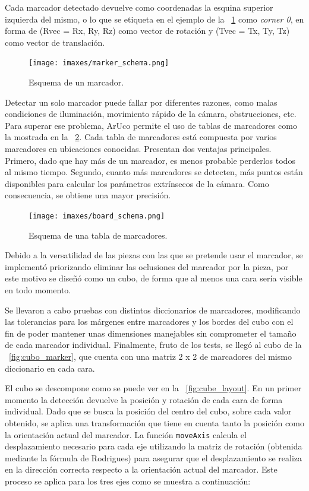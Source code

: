 Cada marcador detectado devuelve como coordenadas la esquina superior izquierda del mismo, o lo que se etiqueta en el ejemplo de la \figurename~\ref{fig:marker_schema} como \emph{corner 0}, en forma de (Rvec = {Rx, Ry, Rz}) como vector de rotación y (Tvec = {Tx, Ty, Tz}) como vector de translación.

\begin{figure}
  \centering
  \texttt{[image: imaxes/marker\_schema.png]}
  \caption{Esquema de un marcador.}
  \label{fig:marker_schema}
\end{figure}

Detectar un solo marcador puede fallar por diferentes razones, como malas condiciones de iluminación, movimiento rápido de la cámara, obstrucciones, etc. Para superar ese problema, ArUco permite el uso de tablas de marcadores como la mostrada en la \figurename~\ref{fig:board_schema}. Cada tabla de marcadores está compuesta por varios marcadores en ubicaciones conocidas. Presentan dos ventajas principales. Primero, dado que hay más de un marcador, es menos probable perderlos todos al mismo tiempo. Segundo, cuanto más marcadores se detecten, más puntos están disponibles para calcular los parámetros extrínsecos de la cámara. Como consecuencia, se obtiene una mayor precisión. 

\begin{figure}
  \centering
  \texttt{[image: imaxes/board\_schema.png]}
  \caption{Esquema de una tabla de marcadores.}
  \label{fig:board_schema}
\end{figure}


Debido a la versatilidad de las piezas con las que se pretende usar el marcador, se implementó priorizando eliminar las oclusiones del marcador por la pieza, por este motivo se diseñó como un cubo, de forma que al menos una cara sería visible en todo momento. 

Se llevaron a cabo pruebas con distintos diccionarios de marcadores, modificando las tolerancias para los márgenes entre marcadores y los bordes del cubo con el fin de poder mantener unas dimensiones manejables sin comprometer el tamaño de cada marcador individual.
Finalmente, fruto de los tests, se llegó al cubo de la \figurename~\ref{fig:cubo_marker}, que cuenta con una matriz 2 x 2 de marcadores del mismo diccionario en cada cara.

El cubo se descompone como se puede ver en la \figurename~\ref{fig:cube_layout}. En un primer momento la detección devuelve la posición y rotación de cada cara de forma individual. Dado que se busca la posición del centro del cubo, sobre cada valor obtenido, se aplica una transformación que tiene en cuenta tanto la posición como la orientación actual del marcador. La función \texttt{moveAxis} calcula el desplazamiento necesario para cada eje utilizando la matriz de rotación (obtenida mediante la fórmula de Rodrigues) para asegurar que el desplazamiento se realiza en la dirección correcta respecto a la orientación actual del marcador. Este proceso se aplica para los tres ejes como se muestra a continuación:

